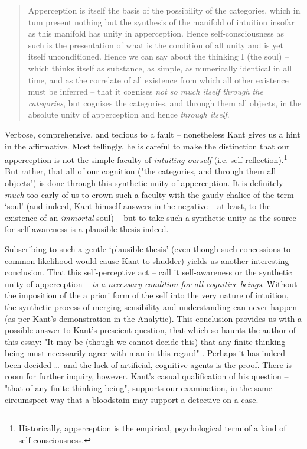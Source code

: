 \begin{quote}
  Apperception is itself the basis of the possibility of the categories, which in tum present nothing but the synthesis of the manifold of intuition insofar as this manifold has unity in apperception. Hence self-consciousness as such is the presentation of what is the condition of all unity and is yet itself unconditioned. Hence we can say about the thinking I (the soul) -- which thinks itself as substance, as simple, as numerically identical in all time, and as the correlate of all existence from which all other existence must be inferred -- that it cognises \emph{not so much itself through the categories}, but cognises the categories, and through them all objects, in the absolute unity of apperception and hence \emph{through itself}.

  \autocite[A399]{hackett}
\end{quote}

\noindent
Verbose, comprehensive, and tedious to a fault -- nonetheless Kant gives us a hint in the affirmative. Most tellingly, he is careful to make the distinction that our apperception is not the simple faculty of \emph{intuiting ourself} (i.e. self-reflection).\footnote{Historically, apperception is the empirical, psychological term of a kind of self-consciousness.} But rather, that all of our cognition ("the categories, and through them all objects") is done through this synthetic unity of apperception. It is definitely \emph{much} too early of us to crown such a faculty with the gaudy chalice of the term `soul' (and indeed, Kant himself answers in the negative -- at least, to the existence of an \emph{immortal} soul) -- but to take such a synthetic unity as the source for self-awareness is a plausible thesis indeed.

Subscribing to such a gentle `plausible thesis' (even though such concessions to common likelihood would cause Kant to shudder) yields us another interesting conclusion. That this self-perceptive act -- call it self-awareness or the synthetic unity of apperception -- \emph{is a necessary condition for all cognitive beings}. Without the imposition of the a priori form of the self into the very nature of intuition, the synthetic process of merging sensibility and understanding can never happen (as per Kant's demonstration in the Analytic). This conclusion provides us with a possible answer to Kant's prescient question, that which so haunts the author of this essay: "It may be (though we cannot decide this) that any finite thinking being must necessarily agree with man in this regard" \autocite[B72]{hackett}. Perhaps it has indeed been decided \ldots\ and the lack of artificial, cognitive agents is the proof. There is room for further inquiry, however. Kant's casual qualification of his question -- "that of any finite thinking being", supports our examination, in the same circumspect way that a bloodstain may support a detective on a case.

